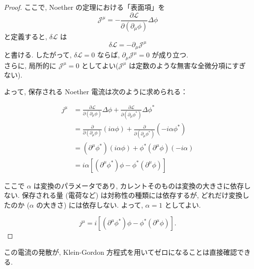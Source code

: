 \documentclass[a4paper,12pt]{article}
\begin{document}
\begin{proof}
ここで, Noether の定理における「表面項」を
\begin{equation*}
\mathcal{J}^\mu = -\frac{\partial \mathcal{L}}{\partial (\partial_\mu \phi)} \Delta \phi \tag{2-2.g23}
\end{equation*}
と定義すると, $\delta \mathcal{L}$ は
\begin{equation*}
\delta \mathcal{L} = -\partial_\mu \mathcal{J}^\mu \tag{2-2.g24}
\end{equation*}
と書ける. したがって, $\delta \mathcal{L} = 0$ ならば, $\partial_\mu \mathcal{J}^\mu = 0$ が成り立つ.\\
さらに, 局所的に $\mathcal{J}^\mu = 0$ としてよい($\mathcal{J}^\mu$ は定数のような無害な全微分項にすぎない).\par
よって, 保存される Noether 電流は次のように求められる：

\begin{align*}
    j^\mu &= \frac{\partial \mathcal{L}}{\partial (\partial_\mu \phi)} \Delta \phi + \frac{\partial \mathcal{L}}{\partial (\partial_\mu \phi^*)} \Delta \phi^* \tag{2-2.g25}\\
    &= \frac{\partial}{\partial(\partial_\mu \phi)}(i\alpha \phi) + \frac{\partial}{\partial(\partial_\mu \phi^*)}(-i\alpha \phi^*) \tag{2-2.g26}\\
    &= (\partial^\mu \phi^*) (i\alpha \phi) + \phi^* (\partial^\mu \phi) (-i\alpha) \tag{2-2.g27}\\
    &= i\alpha \left[ (\partial^\mu \phi^*) \phi - \phi^* (\partial^\mu \phi) \right] \tag{2-2.g28}
\end{align*}

ここで $\alpha$ は変換のパラメータであり, カレントそのものは変換の大きさに依存しない. 保存される量 (電荷など) は対称性の種類には依存するが, どれだけ変換したのか ($\alpha$ の大きさ) には依存しない. よって, $\alpha = 1$ としてよい.

\begin{equation*}
    j^\mu = i \left[ (\partial^\mu \phi^*) \phi - \phi^* (\partial^\mu \phi) \right]. \tag{2-2.g29}
\end{equation*}

\end{proof}

\color{black}

\noindent この電流の発散が, Klein-Gordon 方程式を用いてゼロになることは直接確認できる.
\end{document}
